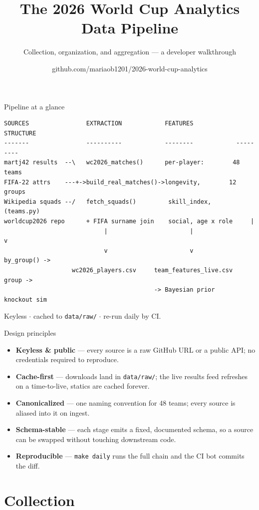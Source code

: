 \documentclass[aspectratio=169]{beamer}
\title[WC2026 Data Pipeline]{The 2026 World Cup Analytics Data Pipeline}
\subtitle{Collection, organization, and aggregation --- a developer walkthrough}
\author{github.com/mariaob1201/2026-world-cup-analytics}
\date{}
\begin{document}
\begin{frame}[plain]\titlepage\end{frame}

\begin{frame}{Pipeline at a glance}
\footnotesize
\begin{verbatim}
SOURCES                EXTRACTION            FEATURES            STRUCTURE
-------                ----------            --------            ---------
martj42 results  --\   wc2026_matches()      per-player:        48 teams
FIFA-22 attrs    ---+->build_real_matches()->longevity,        12 groups
Wikipedia squads --/   fetch_squads()         skill_index,      (teams.py)
worldcup2026 repo      + FIFA surname join    social, age x role     |
                            |                       |                 v
                            v                       v            by_group() ->
                   wc2026_players.csv     team_features_live.csv  group ->
                                          -> Bayesian prior       knockout sim
\end{verbatim}
\centering\scriptsize Keyless $\cdot$ cached to \texttt{data/raw/} $\cdot$ re-run daily by CI.
\end{frame}

\begin{frame}{Design principles}
\begin{itemize}
  \item \textbf{Keyless \& public} --- every source is a raw GitHub URL or a
        public API; no credentials required to reproduce.
  \item \textbf{Cache-first} --- downloads land in \texttt{data/raw/}; the live
        results feed refreshes on a time-to-live, statics are cached forever.
  \item \textbf{Canonicalized} --- one naming convention for 48 teams; every
        source is aliased into it on ingest.
  \item \textbf{Schema-stable} --- each stage emits a fixed, documented schema,
        so a source can be swapped without touching downstream code.
  \item \textbf{Reproducible} --- \texttt{make daily} runs the full chain and
        the CI bot commits the diff.
\end{itemize}
\end{frame}

\section{Collection}
\end{document}
